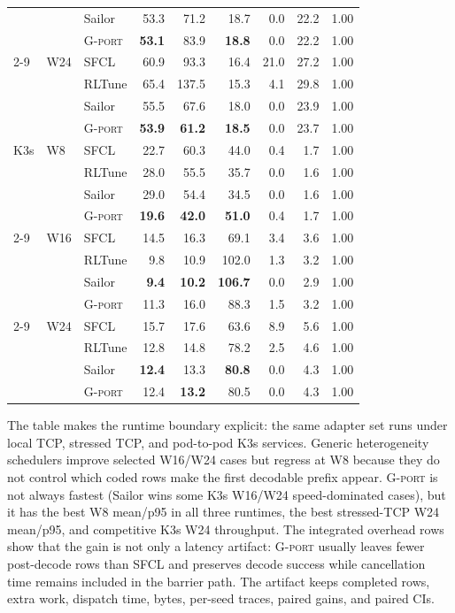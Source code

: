 \begin{table}[t]
\begin{tabular*}{\textwidth}{@{\extracolsep{\fill}}lllrrrrrr@{}}
        &     & Sailor & 53.3 & 71.2 & 18.7 & 0.0 & 22.2 & 1.00 \\
        &     & \textsc{G-port} & \textbf{53.1} & 83.9 & \textbf{18.8} & 0.0 & 22.2 & 1.00 \\
    \cmidrule(l){2-9}
        & W24 & SFCL & 60.9 & 93.3 & 16.4 & 21.0 & 27.2 & 1.00 \\
        &     & RLTune & 65.4 & 137.5 & 15.3 & 4.1 & 29.8 & 1.00 \\
        &     & Sailor & 55.5 & 67.6 & 18.0 & 0.0 & 23.9 & 1.00 \\
        &     & \textsc{G-port} & \textbf{53.9} & \textbf{61.2} & \textbf{18.5} & 0.0 & 23.7 & 1.00 \\
    \midrule
    K3s & W8 & SFCL & 22.7 & 60.3 & 44.0 & 0.4 & 1.7 & 1.00 \\
        &    & RLTune & 28.0 & 55.5 & 35.7 & 0.0 & 1.6 & 1.00 \\
        &    & Sailor & 29.0 & 54.4 & 34.5 & 0.0 & 1.6 & 1.00 \\
        &    & \textsc{G-port} & \textbf{19.6} & \textbf{42.0} & \textbf{51.0} & 0.4 & 1.7 & 1.00 \\
    \cmidrule(l){2-9}
        & W16 & SFCL & 14.5 & 16.3 & 69.1 & 3.4 & 3.6 & 1.00 \\
        &     & RLTune & 9.8 & 10.9 & 102.0 & 1.3 & 3.2 & 1.00 \\
        &     & Sailor & \textbf{9.4} & \textbf{10.2} & \textbf{106.7} & 0.0 & 2.9 & 1.00 \\
        &     & \textsc{G-port} & 11.3 & 16.0 & 88.3 & 1.5 & 3.2 & 1.00 \\
    \cmidrule(l){2-9}
        & W24 & SFCL & 15.7 & 17.6 & 63.6 & 8.9 & 5.6 & 1.00 \\
        &     & RLTune & 12.8 & 14.8 & 78.2 & 2.5 & 4.6 & 1.00 \\
        &     & Sailor & \textbf{12.4} & 13.3 & \textbf{80.8} & 0.0 & 4.3 & 1.00 \\
        &     & \textsc{G-port} & 12.4 & \textbf{13.2} & 80.5 & 0.0 & 4.3 & 1.00 \\
    \bottomrule
  \end{tabular*}
\end{table}

The table makes the runtime boundary explicit: the same adapter set runs under
local TCP, stressed TCP, and pod-to-pod K3s services.  Generic heterogeneity
schedulers improve selected W16/W24 cases but regress at W8 because they do not
control which coded rows make the first decodable prefix appear.  \textsc{G-port}
is not always fastest (Sailor wins some K3s W16/W24 speed-dominated cases), but
it has the best W8 mean/p95 in all three runtimes, the best stressed-TCP W24
mean/p95, and competitive K3s W24 throughput.  The integrated overhead rows show
that the gain is not only a latency artifact: \textsc{G-port} usually leaves
fewer post-decode rows than SFCL and preserves decode success while cancellation
time remains included in the barrier path.  The artifact keeps completed rows,
extra work, dispatch time, bytes, per-seed traces, paired gains, and paired CIs.

